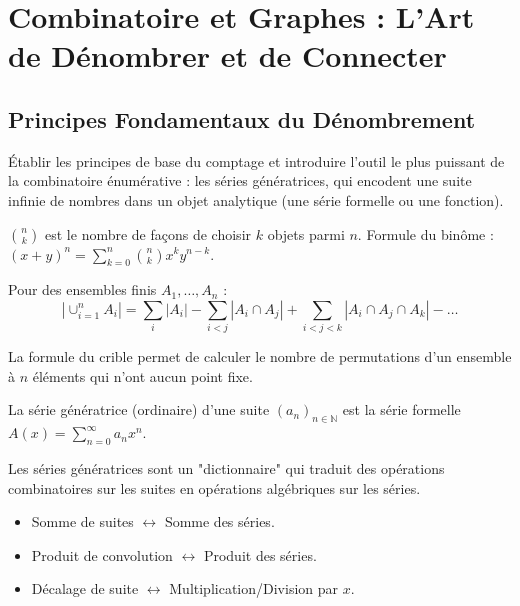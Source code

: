 \chapter{Combinatoire et Graphes : L'Art de Dénombrer et de Connecter}

\section{Principes Fondamentaux du Dénombrement}

\begin{objectif}
    Établir les principes de base du comptage et introduire l'outil le plus puissant de la combinatoire énumérative : les séries génératrices, qui encodent une suite infinie de nombres dans un objet analytique (une série formelle ou une fonction).
\end{objectif}

\begin{definition}
    $\binom{n}{k}$ est le nombre de façons de choisir $k$ objets parmi $n$. Formule du binôme : $(x+y)^n = \sum_{k=0}^n \binom{n}{k} x^k y^{n-k}$.
\end{definition}

\begin{proposition}
    Pour des ensembles finis $A_1, \dots, A_n$ :
    $$ |\cup_{i=1}^n A_i| = \sum_i |A_i| - \sum_{i<j} |A_i \cap A_j| + \sum_{i<j<k} |A_i \cap A_j \cap A_k| - \dots $$
\end{proposition}
\begin{application}
    La formule du crible permet de calculer le nombre de permutations d'un ensemble à $n$ éléments qui n'ont aucun point fixe.
\end{application}

\begin{definition}
    La série génératrice (ordinaire) d'une suite $(a_n)_{n \in \mathbb{N}}$ est la série formelle $A(x) = \sum_{n=0}^\infty a_n x^n$.
\end{definition}
\begin{remark}
    Les séries génératrices sont un "dictionnaire" qui traduit des opérations combinatoires sur les suites en opérations algébriques sur les séries.
    \begin{itemize}
        \item Somme de suites $\leftrightarrow$ Somme des séries.
        \item Produit de convolution $\leftrightarrow$ Produit des séries.
        \item Décalage de suite $\leftrightarrow$ Multiplication/Division par $x$.
    \end{itemize}
\end{remark}

